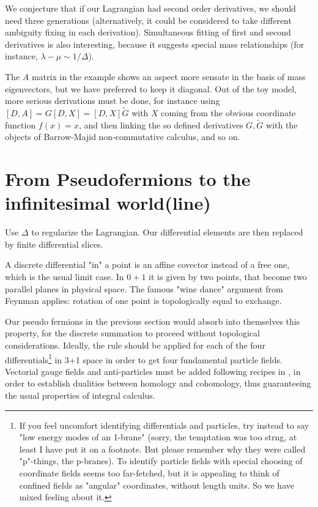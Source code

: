 \documentclass[a4paper,10pt]{article}
\begin{document}
We conjecture that if our Lagrangian had second order derivatives, we should
need three generations (alternatively, it could be considered to take
different ambiguity fixing in each derivation). Simultaneous fitting of first
and second derivatives is also interesting, because it suggests special
mass relationships (for instance, $\lambda-\mu\sim 1/\Delta$).

The $A$ matrix in the example shows an aspect more sensate in the basis
of mass eigenvectors, but we have preferred to keep it diagonal. 
Out of the toy model,  more serious derivations must be done, for instance
using $[D,A]= G [D,X]= [D,X] \tilde G$ with $X$ coming from the
obvious coordinate
function $f(x)=x$, and then linking the so defined derivatives $G,\tilde G$ 
with the objects
of Barrow-Majid non-commutative calculus, and so on.

\section{From Pseudofermions to the infinitesimal world(line)}

Use $\Delta$ to regularize the Lagrangian. Our differential
elements are then replaced by finite differential slices. 

A discrete differential "in" a point is an affine covector instead of
a free one, which is the usual limit case. In $0+1$ it is given by two
points, that become two parallel planes in physical space. The famous\cite{g} 
"wine dance" argument from Feynman applies: rotation of one 
point is topologically equal to exchange.

Our pseudo fermions in the previous section would absorb into themselves
this property, for the discrete summation to proceed without topological
considerations. Ideally, the rule should be applied for each of the four
differentials\footnote{If you feel uncomfort identifying differentials
and particles, try instead to say "low energy modes of an 1-brane" (sorry,
the temptation was too strng, at least I have put it on a footnote. But
please remember why they were called "p"-things, the p-branes). To identify
particle fields with special choosing of coordinate fields seems too
far-fetched, but it is appealing to think of confined fields as
"angular" coordinates, without length units. So we have mixed feeling
about it.
}
 in 3+1 space in order to get four fundamental particle fields. 
Vectorial gauge fields and anti-particles must
be added following recipes in \cite{connes}, in order to establish
dualities between homology and cohomology, thus guaranteeing
the usual properties of integral calculus.  
\end{document}
